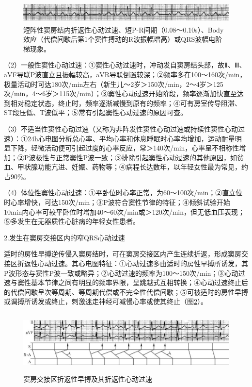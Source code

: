 \begin{figure}[!htbp]
 \centering
 \includegraphics[width=5.78125in,height=0.45833in]{./images/Image00517.jpg}
 \captionsetup{justification=centering}
 \caption{短阵性窦房结内折返性心动过速、短P-R间期（0.08～0.10s）、Body效应（代偿间歇后第1个窦性搏动的R波振幅增高）或QRS波幅电阶梯现象。}
 \label{fig32-1}
  \end{figure} 

（2）一般性窦性心动过速：①窦性心动过速时，冲动发自窦房结头部，故Ⅱ、Ⅲ、aVF导联P波直立且振幅较高，aVR导联倒置较深；②频率多在100～160次/min，极量活动时可达180次/min左右（新生儿～2岁＞150次/min，2～4岁＞125次/min，4～6岁＞115次/min）；③窦性心动过速开始阶段，频率逐渐加快直至达到相对稳定状态，终止时，频率逐渐减慢到原有的频率；④可有房室传导阻滞、ST段压低、T波低平；⑤常有引起窦性心动过速的原因可查。

（3）不适当性窦性心动过速（又称为非阵发性窦性心动过速或持续性窦性心动过速）：①24h心电图分析总心率、平均心率和休息睡眠时心率均增加，运动耐量明显下降，轻微活动便可引起过度的心率反应，常＞140次/min，心率呈不相称性增加；②P波极性与正常窦性P波一致；③排除引起窦性心动过速的其他原因，如贫血、甲状腺功能亢进、妊娠、药物等；④病程长达数年，以年轻女性最为常见，约占90\%。

（4）体位性窦性心动过速：①平卧位时心率正常，为60～100次/min；②直立位时心率增快，可达150次/min；③P波符合窦性节律的特征；④倾斜试验开始10min内心率可较平卧位时增加40～60次/min或＞120次/min，但无低血压表现；⑤多发生在无器质性心脏病的年轻女性患者。

2.发生在窦房交接区内的窄QRS心动过速

适时的房性早搏逆传侵入窦房结时，可在窦房交接区内产生连续折返，形成窦房交接区折返性心动过速。其心电图特征：①心动过速多由适时的房性早搏所诱发，其P波形态与窦性P波一致或略异；②心动过速的频率为100～150次/min；③心动过速与窦性基本节律之间有明显的频率界限，呈跳越式互相转换；④心动过速终止后的代偿间歇呈次等周期、等周期代偿或不完全性代偿间歇；⑤可被适时的房性早搏或调搏所诱发或终止，刺激迷走神经可减慢心率或使其终止（图\ref{fig32-2}）。

\begin{figure}[!htbp]
 \centering
 \includegraphics[width=5.78125in,height=1.26042in]{./images/Image00518.jpg}
 \captionsetup{justification=centering}
 \caption{窦房交接区折返性早搏及其折返性心动过速}
 \label{fig32-2}
  \end{figure} 

